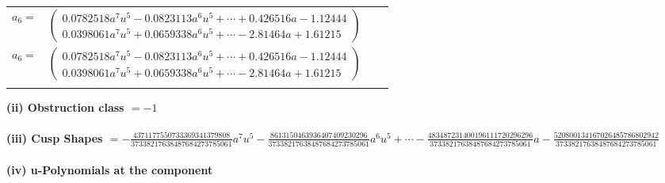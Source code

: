 \documentclass[1p]{elsarticle_modified}
\theoremstyle{definition}
\begin{document}
\begin{tabular}{m{7pt} m{180pt} m{7pt} m{180pt} }
\flushright $a_{6}=$&$\begin{pmatrix}0.0782518 a^{7} u^{5}-0.0823113 a^{6} u^{5}+\cdots+0.426516 a-1.12444\\0.0398061 a^{7} u^{5}+0.0659338 a^{6} u^{5}+\cdots-2.81464 a+1.61215\end{pmatrix}$\\ \flushright $a_{6}=$&$\begin{pmatrix}0.0782518 a^{7} u^{5}-0.0823113 a^{6} u^{5}+\cdots+0.426516 a-1.12444\\0.0398061 a^{7} u^{5}+0.0659338 a^{6} u^{5}+\cdots-2.81464 a+1.61215\end{pmatrix}$\\&\end{tabular}
\flushleft \textbf{(ii) Obstruction class $= -1$}\\~\\
\flushleft \textbf{(iii) Cusp Shapes $= -\frac{4371177550733369341379808}{37338217638487684273785061} a^7 u^5-\frac{8613150463936407409230296}{37338217638487684273785061} a^6 u^5+\cdots-\frac{483487231400196111720296296}{37338217638487684273785061} a-\frac{520800134167026485786802942}{37338217638487684273785061}$}\\~\\
\newpage\renewcommand{\arraystretch}{1}
\flushleft \textbf{(iv) u-Polynomials at the component}\newline \\
\end{document}
